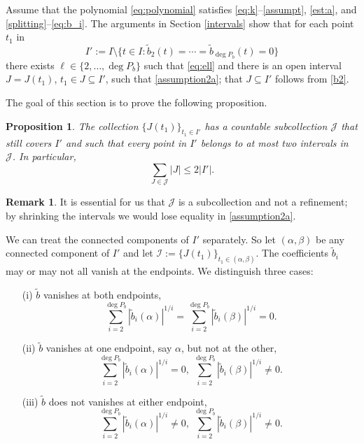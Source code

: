 \documentclass[12pt]{amsart}
\theoremstyle{plain}
\newtheorem{proposition}{Proposition}
\theoremstyle{definition}
\newtheorem{remark}{Remark}
\numberwithin{equation}{section}
\begin{document}
Assume that the polynomial \eqref{eq:polynomial} satisfies \eqref{eq:k}--\eqref{assumpt}, \eqref{est:a}, and \eqref{splitting}--\eqref{eq:b_i}. 
The arguments in Section \ref{intervals} show that for each point $t_1$ in  
\[
  I' := I \setminus \{t \in I : \tilde b_2 (t) = \cdots = \tilde b_{\deg P_b}(t) = 0\}
\]
there exists $\ell \in \{2, \ldots, \deg P_b\}$ such that \eqref{eq:ell} 
and there is an open interval $J = J(t_1)$, $t_1 \in J \subseteq I'$, such that \eqref{assumption2a}; that $J \subseteq I'$ 
follows from \eqref{b2}.

The goal of this section is to prove the following proposition.

\begin{proposition} \label{cover}
  The collection $\{J(t_1)\}_{t_1\in I'}$ has a countable subcollection ${\mathcal{J}}$ that still 
  covers $I'$ and such that every point in $I'$ belongs to at most two intervals in ${\mathcal{J}}$. 
  In particular, 
  \[
    \sum_{J \in {\mathcal{J}}} |J| \le 2 |I'|.
  \]  
\end{proposition}

\begin{remark}
   It is essential for us that ${\mathcal{J}}$ is a subcollection and not a refinement; by shrinking the intervals we would lose equality in  
   \eqref{assumption2a}. 
\end{remark} 

We can treat the connected components of $I'$ separately. 
So let $({\alpha},{\beta})$ be any connected component of $I'$ and let ${\mathcal{I}} := \{J(t_1)\}_{t_1 \in ({\alpha},{\beta})}$. 
The coefficients $\tilde b_i$ may or may not all vanish at the endpoints.
We distinguish 
three cases:
\begin{enumerate}
  \item[(i)] $\tilde b$ vanishes at both endpoints,
  \begin{equation}
     \label{1case}
    \sum_{i=2}^{\deg P_b} |\tilde b_i({\alpha})|^{1/i}  = \sum_{i=2}^{\deg P_b} |\tilde b_i({\beta})|^{1/i} = 0. 
  \end{equation}
  \item[(ii)] $\tilde b$ vanishes at one endpoint, say ${\alpha}$, but not at the other, 
  \begin{equation}
     \label{2case}
    \sum_{i=2}^{\deg P_b} |\tilde b_i({\alpha})|^{1/i}   = 0, ~\sum_{i=2}^{\deg P_b} |\tilde b_i({\beta})|^{1/i} \ne 0.
   \end{equation} 
   \item[(iii)] $\tilde b$ does not vanishes at either endpoint,
   \begin{equation}
    \label{3case}
    \sum_{i=2}^{\deg P_b} |\tilde b_i({\alpha})|^{1/i}   \ne 0, ~\sum_{i=2}^{\deg P_b} |\tilde b_i({\beta})|^{1/i} \ne 0. 
   \end{equation}
\end{enumerate}
\end{document}

